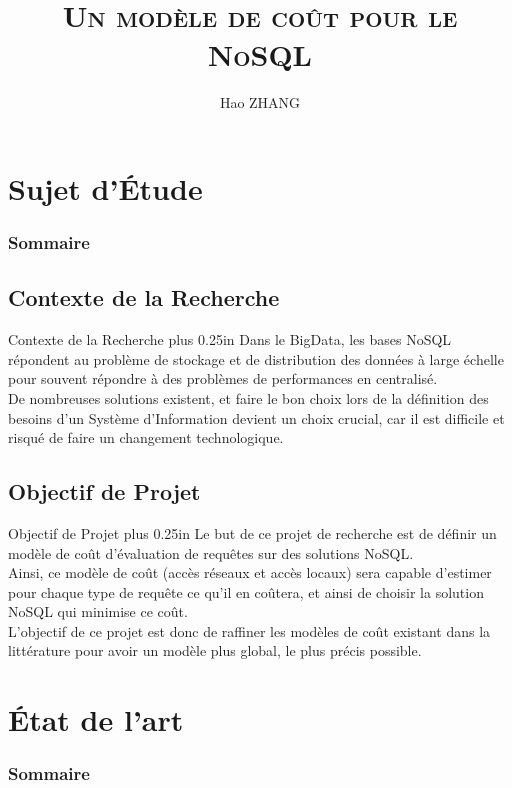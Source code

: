 \documentclass[xcolor=dvipsnames]{beamer}
\title[Sujet n°15]{\textsc{Un modèle de coût pour le NoSQL}}
\author{Hao ZHANG}
\institute{\texttt{RECHERCHE COMPARATIVE DU MODÈLE DE COÛT POUR LA NORMALISATION ET LA DÉNORMALISATION DE BD NOSQL }}
\date{\displaydate{date}}
\renewcommand{\raggedright}{\leftskip=0pt \rightskip=0pt plus 0.25in}
\begin{document}
\begin{frame}
	\titlepage
\end{frame}

\section{Sujet d'Étude}
\begin{frame}
	\frametitle{Sommaire}
	\tableofcontents[currentsection]
\end{frame}

\subsection{Contexte de la Recherche}
\begin{frame}{Contexte de la Recherche}
	\raggedright
	Dans le BigData, les bases NoSQL répondent au problème de stockage et de distribution des données à large échelle pour souvent répondre à des problèmes de performances en centralisé.\\
	\vspace{1em}
	De nombreuses solutions existent, et faire le bon choix lors de la définition des besoins d’un Système d'Information devient un choix crucial, car il est difficile et risqué de faire un changement technologique.
\end{frame}

\subsection{Objectif de Projet}
\begin{frame}{Objectif de Projet}
	\raggedright
	Le but de ce projet de recherche est de définir un modèle de coût d’évaluation de requêtes sur des solutions NoSQL.\\
	\vspace{1em}
	Ainsi, ce modèle de coût (accès réseaux et accès locaux) sera capable d’estimer pour chaque type de requête ce qu’il en coûtera, et ainsi de choisir la solution NoSQL qui minimise ce coût.\\
	\vspace{1em}
	L'objectif de ce projet est donc de raffiner les modèles de coût existant dans la littérature pour avoir un modèle plus global, le plus précis possible. 
\end{frame}

\section{État de l'art}
\begin{frame}
\frametitle{Sommaire}
\tableofcontents[currentsection]
\end{frame}
\end{document}
